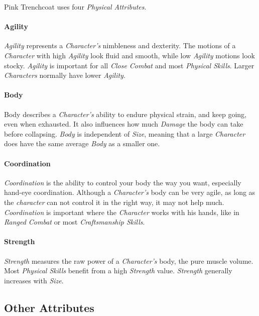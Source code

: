 Pink Trenchcoat uses four \emph{Physical Attributes}.

\paragraph{Agility}

\emph{Agility} represents a \emph{Character's} nimbleness and dexterity. The motions
of a \emph{Character} with high \emph{Agility} look fluid and smooth, while low
\emph{Agility} motions look stocky. \emph{Agility} is important for all
\emph{Close Combat} and most \emph{Physical Skills}. Larger \emph{Characters}
normally have lower \emph{Agility}.

\paragraph{Body}
Body describes a \emph{Character's} ability to endure physical strain, and keep
going, even when exhausted. It also influences how much \emph{Damage} the body can
take before collapsing. \emph{Body} is independent of \emph{Size}, meaning that a
large \emph{Character} does have the same average \emph{Body} as a smaller one.

\paragraph{Coordination}

\emph{Coordination} is the ability to control your body the way you want, especially
hand-eye coordination. Although a \emph{Character's} body can be very agile, as long
as the \emph{character} can not control it in the right way, it may not help much.
\emph{Coordination} is important where the \emph{Character} works with his hands,
like in \emph{Ranged Combat} or most \emph{Craftsmanship Skills}.

\paragraph{Strength}

\emph{Strength} measures the raw power of a \emph{Character's} body, the pure muscle
volume. Most \emph{Physical Skills} benefit from a high \emph{Strength} value.
\emph{Strength} generally increases with \emph{Size}.

\subsection{Other Attributes}
